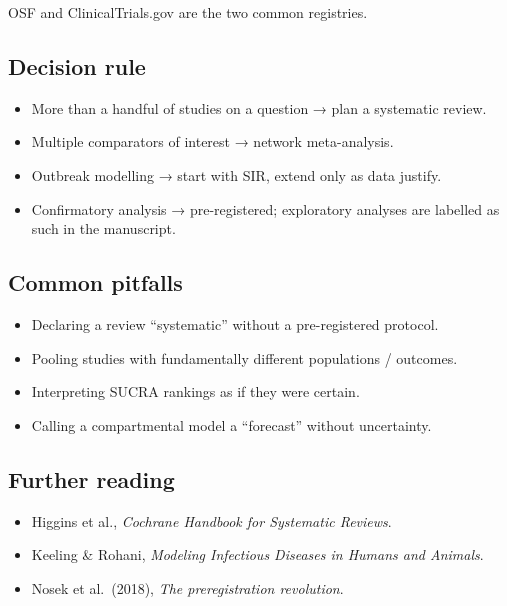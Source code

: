 \documentclass[
]{article}
\providecommand{\tightlist}{%
  \setlength{\itemsep}{0pt}\setlength{\parskip}{0pt}}
\begin{document}
OSF and ClinicalTrials.gov are the two common registries.

\subsection{Decision rule}\label{decision-rule-11}

\begin{itemize}
\tightlist
\item
  More than a handful of studies on a question → plan a systematic
  review.
\item
  Multiple comparators of interest → network meta-analysis.
\item
  Outbreak modelling → start with SIR, extend only as data justify.
\item
  Confirmatory analysis → pre-registered; exploratory analyses are
  labelled as such in the manuscript.
\end{itemize}

\subsection{Common pitfalls}\label{common-pitfalls-11}

\begin{itemize}
\tightlist
\item
  Declaring a review ``systematic'' without a pre-registered protocol.
\item
  Pooling studies with fundamentally different populations / outcomes.
\item
  Interpreting SUCRA rankings as if they were certain.
\item
  Calling a compartmental model a ``forecast'' without uncertainty.
\end{itemize}

\subsection{Further reading}\label{further-reading-11}

\begin{itemize}
\tightlist
\item
  Higgins et al., \emph{Cochrane Handbook for Systematic Reviews}.
\item
  Keeling \& Rohani, \emph{Modeling Infectious Diseases in Humans and
  Animals}.
\item
  Nosek et al.~(2018), \emph{The preregistration revolution}.
\end{itemize}
\end{document}
